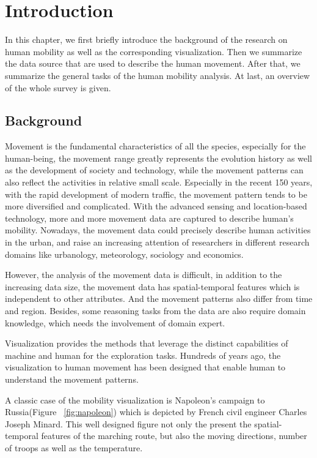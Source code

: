 \chapter{Introduction}
\label{chap:intro}
In this chapter, we first briefly introduce the background of the research on human mobility as well as the corresponding visualization. Then we summarize the data source that are used to describe the human movement. After that, we summarize the general tasks of the human mobility analysis. At last, an overview of the whole survey is given.


\section{Background}

Movement is the fundamental characteristics of all the species, especially for the human-being, the movement range greatly represents the evolution history as well as the development of society and technology, while the movement patterns can also reflect the activities in relative small scale. Especially in the recent 150 years, with the rapid development of modern traffic, the movement pattern tends to be more diversified and complicated.  With the advanced sensing and location-based technology, more and more movement data are captured to describe human’s mobility. Nowadays, the movement data could precisely describe human activities in the urban, and raise an increasing attention of researchers in different research domains like urbanology, meteorology, sociology and economics. 

However, the analysis of the movement data is difficult, in addition to the increasing data size, the movement data has spatial-temporal features which is independent to other attributes. And the movement patterns also differ from time and region. Besides, some reasoning tasks from the data are also require domain knowledge, which needs the involvement of domain expert. 

Visualization provides the methods that leverage the distinct capabilities of machine and human for the exploration tasks. Hundreds of years ago, the visualization to human movement has been designed that enable human to understand the movement patterns. 

A classic case of the mobility visualization is Napoleon’s campaign to Russia(Figure ~\ref{fig:napoleon}) which is depicted by French civil engineer Charles Joseph Minard. This well designed figure not only the present the spatial-temporal features of the marching route, but also the moving directions, number of troops as well as the temperature.  


